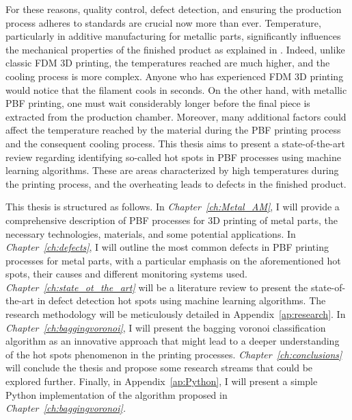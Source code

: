 For these reasons, quality control, defect detection, and ensuring the production process adheres to standards are crucial now more than ever. Temperature, particularly in additive manufacturing for metallic parts, significantly influences the mechanical properties of the finished product as explained in \citeauthor{williams_situ_2019}. Indeed, unlike classic FDM 3D printing, the temperatures reached are much higher, and the cooling process is more complex. Anyone who has experienced FDM 3D printing would notice that the filament cools in seconds. On the other hand, with metallic PBF printing, one must wait considerably longer before the final piece is extracted from the production chamber. Moreover, many additional factors could affect the temperature reached by the material during the PBF printing process and the consequent cooling process. This thesis aims to present a state-of-the-art review regarding identifying so-called hot spots in PBF processes using machine learning algorithms. These are areas characterized by high temperatures during the printing process, and the overheating leads to defects in the finished product.

This thesis is structured as follows. In \emph{Chapter~\ref{ch:Metal_AM}}, I will provide a comprehensive description of PBF processes for 3D printing of metal parts, the necessary technologies, materials, and some potential applications. In \emph{Chapter~\ref{ch:defects}}, I will outline the most common defects in PBF printing processes for metal parts, with a particular emphasis on the aforementioned hot spots, their causes and different monitoring systems used. \emph{Chapter~\ref{ch:state_ot_the_art}} will be a literature review to present the state-of-the-art in defect detection hot spots using machine learning algorithms. The research methodology will be meticulously detailed in Appendix~\ref{ap:research}. In \emph{Chapter~\ref{ch:baggingvoronoi}}, I will present the bagging voronoi classification algorithm as an innovative approach that might lead to a deeper understanding of the hot spots phenomenon in the printing processes. \emph{Chapter~\ref{ch:conclusions}} will conclude the thesis and propose some research streams that could be explored further. Finally, in Appendix~\ref{ap:Python}, I will present a simple Python \cite{python_software_foundation_python_2023} implementation of the algorithm proposed in \emph{Chapter~\ref{ch:baggingvoronoi}.}